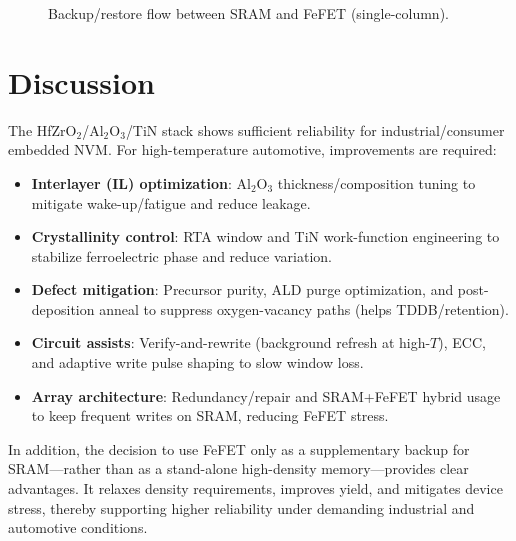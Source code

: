 \documentclass[conference]{IEEEtran}
\begin{document}
\begin{figure}[!t]
  \centering
  \caption{Backup/restore flow between SRAM and FeFET (single-column).}
  \label{fig:backup_flow}
\end{figure}

\section{Discussion}
The HfZrO$_2$/Al$_2$O$_3$/TiN stack shows sufficient reliability for industrial/consumer embedded NVM.
For high-temperature automotive, improvements are required:
\begin{itemize}
  \item \textbf{Interlayer (IL) optimization}: Al$_2$O$_3$ thickness/composition tuning to mitigate wake-up/fatigue and reduce leakage.
  \item \textbf{Crystallinity control}: RTA window and TiN work-function engineering to stabilize ferroelectric phase and reduce variation.
  \item \textbf{Defect mitigation}: Precursor purity, ALD purge optimization, and post-deposition anneal to suppress oxygen-vacancy paths (helps TDDB/retention).
  \item \textbf{Circuit assists}: Verify-and-rewrite (background refresh at high-$T$), ECC, and adaptive write pulse shaping to slow window loss.
  \item \textbf{Array architecture}: Redundancy/repair and SRAM+FeFET hybrid usage to keep frequent writes on SRAM, reducing FeFET stress.
\end{itemize}

In addition, the decision to use FeFET only as a supplementary backup for SRAM---rather than as a stand-alone high-density memory---provides 
clear advantages. It relaxes density requirements, improves yield, and mitigates device stress, thereby supporting higher reliability under demanding 
industrial and automotive conditions.
\end{document}
